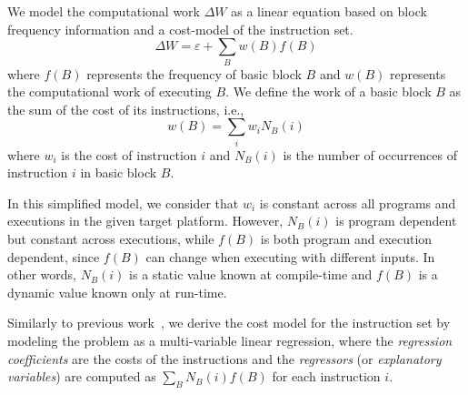\documentclass[sigplan,9pt]{acmart}
\newcommand{\itercomp}{{iterative compilation}}
\begin{document}

We model the computational work $\Delta W$ as a linear equation based on block frequency information and a cost-model of the instruction set.
\[
\Delta W = \varepsilon + \sum_{B} w(B)f(B)
\]
where $f(B)$ represents the frequency of basic block $B$ and $w(B)$ represents the computational work of executing $B$.
We define the work of a basic block $B$ as the sum of the cost of its instructions, i.e.,
\[
w(B) = \sum_{i} w_i N_B(i)
\]
where $w_i$ is the cost of instruction $i$ and $N_B(i)$ is the number of occurrences of instruction $i$ in basic block $B$.

In this simplified model, we consider that $w_i$ is constant across all programs and executions in the given target platform.
However, $N_B(i)$ is program dependent but constant across executions, while $f(B)$ is both program and execution dependent, since $f(B)$ can change when executing with different inputs.
In other words, $N_B(i)$ is a static value known at compile-time and $f(B)$ is a dynamic value known only at run-time.

%

Similarly to previous work~\cite{giusto01,powell09,brandolese11}, we derive the cost model for the instruction set by modeling the problem as a multi-variable linear regression, where the \textit{regression coefficients} are the costs of the instructions and the \textit{regressors} (or \textit{explanatory variables}) are computed as $\sum_B N_B(i)f(B)$ for each instruction $i$.
\end{document}
